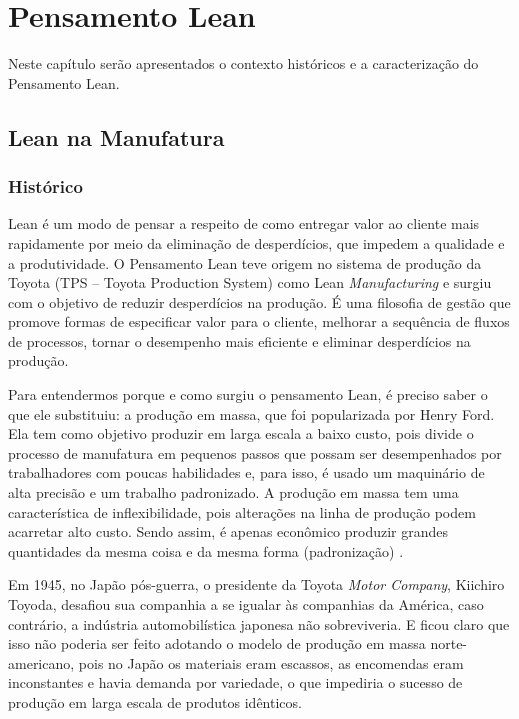 

\chapter[Pensamento Lean]{Pensamento Lean}

Neste capítulo serão apresentados o contexto históricos e a caracterização do Pensamento Lean.

\section[Lean na Manufatura]{Lean na Manufatura}

\subsection[Histórico]{Histórico}

Lean é um modo de pensar a respeito de como entregar valor ao cliente mais rapidamente por meio da eliminação de desperdícios, que impedem a qualidade e a produtividade. O Pensamento Lean teve origem no sistema de produção da Toyota (TPS – Toyota Production System) como Lean \textit{Manufacturing} e surgiu com o objetivo de reduzir desperdícios na produção. É uma filosofia de gestão que promove formas de especificar valor para o cliente, melhorar a sequência de fluxos de processos, tornar o desempenho mais eficiente e eliminar desperdícios na produção. 

Para entendermos porque e como surgiu o pensamento Lean, é preciso saber o que ele substituiu: a produção em massa, que foi popularizada por Henry Ford. Ela tem como objetivo produzir em larga escala a baixo custo, pois divide o processo de manufatura em pequenos passos que possam ser desempenhados por trabalhadores com poucas habilidades e, para isso, é usado um maquinário de alta precisão e um trabalho padronizado. A produção em massa tem uma característica de inflexibilidade, pois alterações na linha de produção podem acarretar alto custo. Sendo assim, é apenas econômico produzir grandes quantidades da mesma coisa e da mesma forma (padronização) \cite{hibbs2009}. 

Em 1945, no Japão pós-guerra, o presidente da Toyota \textit{Motor Company}, Kiichiro Toyoda, desafiou sua companhia a se igualar às companhias da América, caso contrário, a indústria automobilística japonesa não sobreviveria. E ficou claro que isso não poderia ser feito adotando o modelo de produção em massa norte-americano, pois no Japão os materiais eram escassos, as encomendas eram inconstantes e havia demanda por variedade, o que impediria o sucesso de produção em larga escala de produtos idênticos. 

